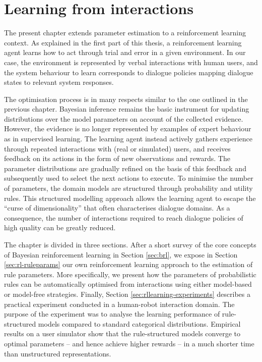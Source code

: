 \chapter{Learning from interactions}
\label{chap:rllearning}

The present chapter extends parameter estimation to a reinforcement learning context.  As explained in the first part of this thesis, a reinforcement learning agent learns how to act through trial and error in a given environment.  In our case, the environment is represented by verbal interactions with human users, and the system behaviour to learn corresponds to dialogue policies mapping dialogue states to relevant system responses. 

The optimisation process is in many respects similar to the one outlined in the previous chapter. Bayesian inference remains the basic instrument for updating distributions over the model parameters on account of the collected evidence.  However, the evidence is no longer represented by examples of expert behaviour as in supervised learning. The learning agent instead actively gathers experience through repeated interactions with (real or simulated) users, and receives feedback on its actions in the form of new observations and rewards. The parameter distributions are gradually refined on the basis of this feedback and subsequently used to select the next actions to execute. To minimise the number of parameters, the domain models are structured through probability and utility rules. This structured modelling approach allows the learning agent to  escape the ``curse of dimensionality'' that often characterises dialogue domains. As a consequence, the number of interactions required to reach dialogue policies of high quality can be greatly reduced. 

The chapter is divided in three sections.  After a short survey of the core concepts of Bayesian reinforcement learning in Section \ref{sec:brl}, we expose in Section \ref{sec:rl-ruleparams} our own reinforcement learning approach to the estimation of rule parameters.  More specifically, we present how the parameters of probabilistic rules can be automatically optimised from interactions using either model-based or model-free strategies. Finally, Section \ref{sec:rllearning-experiments} describes a practical experiment conducted in a human-robot interaction domain. The purpose of the experiment was to analyse the learning performance of rule-structured models compared to standard categorical distributions. Empirical results on a user simulator show that the rule-structured models converge to optimal parameters -- and hence achieve higher rewards -- in a much shorter time than unstructured representations. 


